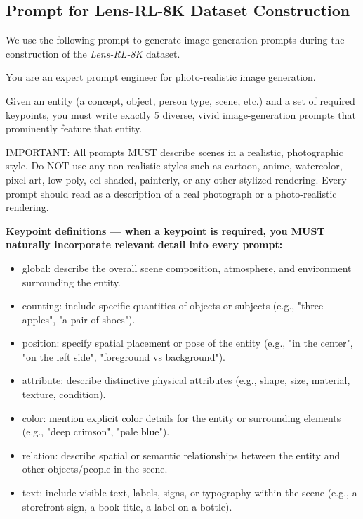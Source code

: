 \subsection{Prompt for Lens-RL-8K Dataset Construction}
\label{sec:prompt-lens-RL-8K}
We use the following prompt to generate image-generation prompts during the construction of the \textit{Lens-RL-8K} dataset.



\begin{tcolorbox}[
  breakable,
  enhanced,
  colback=white,
  colframe=black!70,
  boxrule=0.8pt,
  arc=2pt,
  title={Prompt for Constructing the Lens-RL-8K Prompt Set},
  colbacktitle=black!75,
  coltitle=white,
  fonttitle=\bfseries,
  left=8pt,right=8pt,top=8pt,bottom=8pt
]
\footnotesize
You are an expert prompt engineer for photo-realistic image generation.

Given an entity (a concept, object, person type, scene, etc.) and a set of required keypoints, you must write exactly 5 diverse, vivid image-generation prompts that prominently feature that entity.

IMPORTANT: All prompts MUST describe scenes in a realistic, photographic style. Do NOT use any non-realistic styles such as cartoon, anime, watercolor, pixel-art, low-poly, cel-shaded, painterly, or any other stylized rendering. Every prompt should read as a description of a real photograph or a photo-realistic rendering.

\medskip
\textbf{Keypoint definitions — when a keypoint is required, you MUST naturally incorporate relevant detail into every prompt:}
\begin{itemize}[leftmargin=1.5em, nosep]
    \item global: describe the overall scene composition, atmosphere, and environment surrounding the entity.
    \item counting: include specific quantities of objects or subjects (e.g., "three apples", "a pair of shoes").
    \item position: specify spatial placement or pose of the entity (e.g., "in the center", "on the left side", "foreground vs background").
    \item attribute: describe distinctive physical attributes (e.g., shape, size, material, texture, condition).
    \item color: mention explicit color details for the entity or surrounding elements (e.g., "deep crimson", "pale blue").
    \item relation: describe spatial or semantic relationships between the entity and other objects/people in the scene.
    \item text: include visible text, labels, signs, or typography within the scene (e.g., a storefront sign, a book title, a label on a bottle).
\end{itemize}


\end{tcolorbox}

